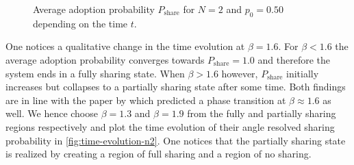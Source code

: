 \documentclass[aps,pra,showpacs,preprintnumbers,amsmath,amssymb,nofootinbib]{revtex4-2}
\begin{document}
\begin{figure}[H]
        \caption{Average adoption probability $P_{\mathrm{share}}$ for $N=2$ and $p_0 = 0.50$ depending on the time $t$.}
        \label{fig:n2p0050}
    \end{figure}
    One notices a qualitative change in the time evolution at $\beta=1.6$.
    For $\beta < 1.6$ the average adoption probability converges towards $P_{\mathrm{share}} = 1.0$ and therefore the system ends in a fully sharing state.
    When $\beta > 1.6$ however, $P_{\mathrm{share}}$ initially increases but collapses to a partially sharing state after some time.
    Both findings are in line with the paper by \citeauthor{Wolf_2022} which predicted a phase transition at $\beta \approx 1.6$ as well.
    We hence choose $\beta=1.3$ and $\beta = 1.9$ from the fully and partially sharing regions respectively and plot the time evolution of their angle resolved sharing probability in \cref{fig:time-evolution-n2}.
    One notices that the partially sharing state is realized by creating a region of full sharing and a region of no sharing.
    
\end{document}
